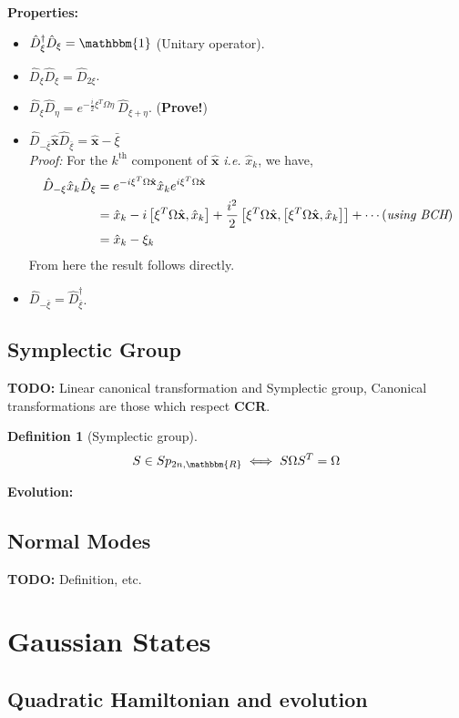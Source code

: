 \documentclass[english,10pt,a4paper]{article}
\newtheorem{definition}{Definition}
\newcommand{\xx}{\hat{\textbf{x}}}
\newcommand{\dd}[1]{\hat{D}_{#1}}
\begin{document}
	\textbf{Properties:}	\begin{itemize}
		\item $\dd{\xi}^\dagger \dd{\xi} = \mathbbm{1}$ (Unitary operator).
		\item $\dd{\xi}\dd{\xi}=\dd{2\xi}$.
		\item $\dd{\xi}\dd{\eta} = e^{-\frac{i}{2}\xi^T\Omega \eta}\ \dd{\xi+\eta}$. (\textbf{Prove!})
		\item$\dd{-\bar{\xi}} \xx \dd{\bar{\xi}} = \xx - \bar{\xi}$\\
		\textit{Proof:} For the $k^\text{th}$ component of $\xx$ \textit{i.e.} $\hat x_k$, we have, \begin{align*}
			\dd{-\xi} \hat x_k \dd{\xi} &= e^{-i\xi^T \Omega\xx}\hat x_k e^{i\xi^T \Omega\xx} \\
			&= \hat x_k -i\left[\xi^T\Omega\xx, \hat x_k \right] + \frac{i^2}{2}\left[ \xi^T\Omega\xx, \left[\xi^T\Omega\xx, \hat x_k \right]   \right] + \cdots \hfil (\textit{using BCH})\\
			&=\hat x_k -\xi_k
		\end{align*}
		From here the result follows directly.
		\item $\dd{-\bar{\xi}} = \dd{\bar{\xi}}^\dagger$.
	\end{itemize}
	
	
	
	\subsection{Symplectic Group}
	\textbf{TODO:} Linear canonical transformation and Symplectic group, Canonical transformations are those which respect  \textbf{CCR}.
	\begin{definition}
		[Symplectic group]
		\begin{equation}
			S\in Sp_{2n,\mathbbm{R}} \iff S\Omega S^T=\Omega
		\end{equation}
	\end{definition}
	\textbf{Evolution:}
	
	
	\subsection{Normal Modes}
	\textbf{TODO: }Definition, etc.
	
	\section{Gaussian States}
	
	\subsection{Quadratic Hamiltonian and evolution}
	
\end{document}
